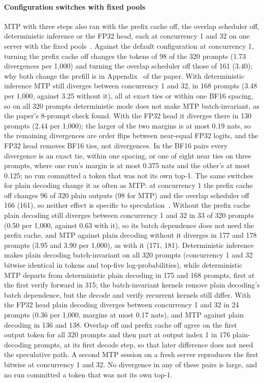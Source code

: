 \paragraph{Configuration switches with fixed pools} MTP with three steps also ran with the prefix cache off, the overlap scheduler off, deterministic inference or the FP32 head, each at concurrency 1 and 32 on one server with the fixed pools~. Against the default configuration at concurrency 1, turning the prefix cache off changes the tokens of 98 of the 320 prompts (1.73 divergences per 1,000) and turning the overlap scheduler off those of 161 (3.40); why both change the prefill is in Appendix~ of the paper. With deterministic inference MTP still diverges between concurrency 1 and 32, in 168 prompts (3.48 per 1,000, against 3.25 without it), all at exact ties or within one BF16 spacing, so on all 320 prompts deterministic mode does not make MTP batch-invariant, as the paper's 8-prompt check found. With the FP32 head it diverges there in 130 prompts (2.44 per 1,000); the larger of the two margins is at most 0.19 nats, so the remaining divergences are order flips between near-equal FP32 logits, and the FP32 head removes BF16 ties, not divergences. In the BF16 pairs every divergence is an exact tie, within one spacing, or one of eight near ties on three prompts, where one run's margin is at most 0.375 nats and the other's at most 0.125; no run committed a token that was not its own top-1. The same switches for plain decoding change it as often as MTP: at concurrency 1 the prefix cache off changes 96 of 320 plain outputs (98 for MTP) and the overlap scheduler off 166 (161), so neither effect is specific to speculation~. Without the prefix cache plain decoding still diverges between concurrency 1 and 32 in 33 of 320 prompts (0.50 per 1,000, against 0.63 with it), so its batch dependence does not need the prefix cache, and MTP against plain decoding without it diverges in 177 and 178 prompts (3.95 and 3.90 per 1,000), as with it (171, 181). Deterministic inference makes plain decoding batch-invariant on all 320 prompts (concurrency 1 and 32 bitwise identical in tokens and top-five log-probabilities), while deterministic MTP departs from deterministic plain decoding in 175 and 168 prompts, first at the first verify forward in 315; the batch-invariant kernels remove plain decoding's batch dependence, but the decode and verify recurrent kernels still differ. With the FP32 head plain decoding diverges between concurrency 1 and 32 in 24 prompts (0.36 per 1,000, margins at most 0.17 nats), and MTP against plain decoding in 136 and 138. Overlap off and prefix cache off agree on the first output token for all 320 prompts and then part at output index 1 in 176 plain-decoding prompts, at its first decode step, so that later difference does not need the speculative path. A second MTP session on a fresh server reproduces the first bitwise at concurrency 1 and 32. No divergence in any of these pairs is large, and no run committed a token that was not its own top-1.

